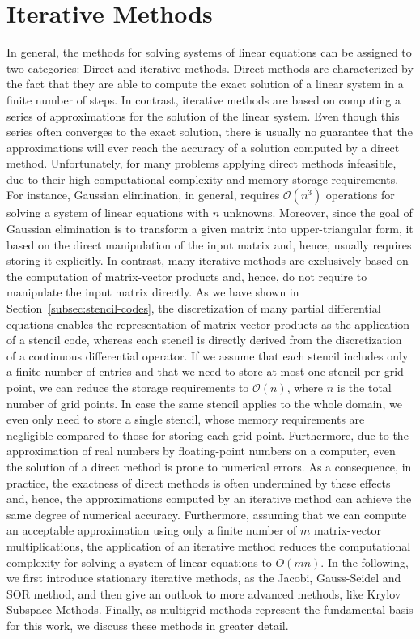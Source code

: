 \section{Iterative Methods}
In general, the methods for solving systems of linear equations can be assigned to two categories: Direct and iterative methods.
Direct methods are characterized by the fact that they are able to compute the exact solution of a linear system in a finite number of steps.
In contrast, iterative methods are based on computing a series of approximations for the solution of the linear system.
Even though this series often converges to the exact solution, there is usually no guarantee that the approximations will ever reach the accuracy of a solution computed by a direct method.
Unfortunately, for many problems applying direct methods infeasible, due to their high computational complexity and memory storage requirements.
For instance, Gaussian elimination, in general, requires $\mathcal O(n^3)$ operations for solving a system of linear equations with $n$ unknowns.
Moreover, since the goal of Gaussian elimination is to transform a given matrix into upper-triangular form, it based on the direct manipulation of the input matrix and, hence, usually requires storing it explicitly.
In contrast, many iterative methods are exclusively based on the computation of matrix-vector products and, hence, do not require to manipulate the input matrix directly.
As we have shown in Section~\ref{subsec:stencil-codes}, the discretization of many partial differential equations enables the representation of matrix-vector products as the application of a stencil code, whereas each stencil is directly derived from the discretization of a continuous differential operator.
If we assume that each stencil includes only a finite number of entries and that we need to store at most one stencil per grid point, we can reduce the storage requirements to $\mathcal{O}(n)$, where $n$ is the total number of grid points.
In case the same stencil applies to the whole domain, we even only need to store a single stencil, whose memory requirements are negligible compared to those for storing each grid point.
Furthermore, due to the approximation of real numbers by floating-point numbers on a computer, even the solution of a direct method is prone to numerical errors.
As a consequence, in practice, the exactness of direct methods is often undermined by these effects and, hence, the approximations computed by an iterative method can achieve the same degree of numerical accuracy.%
Furthermore, assuming that we can compute an acceptable approximation using only a finite number of $m$ matrix-vector multiplications, the application of an iterative method reduces the computational complexity for solving a system of linear equations to $O(mn)$.
In the following, we first introduce stationary iterative methods, as the Jacobi, Gauss-Seidel and SOR method, and then give an outlook to more advanced methods, like Krylov Subspace Methods.
Finally, as multigrid methods represent the fundamental basis for this work, we discuss these methods in greater detail.   
